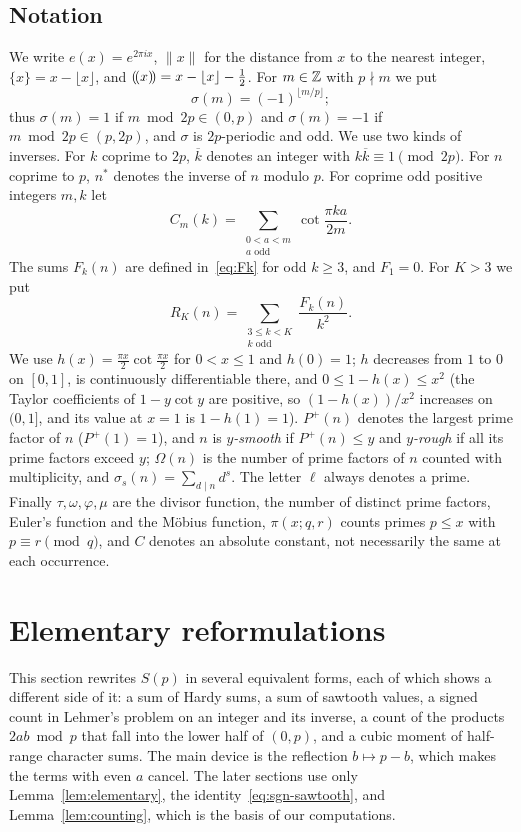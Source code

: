 \subsection{Notation}\label{subsec:notation}
We write $e(x)=e^{2\pi ix}$, $\|x\|$ for the distance from $x$ to the nearest integer, $\{x\}=x-\lfloor x\rfloor$, and $(\!(x)\!)=x-\lfloor x\rfloor-\frac12$. For $m\in\mathbb{Z}$ with $p\nmid m$ we put
\[
\sigma(m)=(-1)^{\lfloor m/p\rfloor};
\]
thus $\sigma(m)=1$ if $m\bmod2p\in(0,p)$ and $\sigma(m)=-1$ if $m\bmod2p\in(p,2p)$, and $\sigma$ is $2p$-periodic and odd. We use two kinds of inverses. For $k$ coprime to $2p$, $\overline k$ denotes an integer with $k\overline k\equiv1\pmod{2p}$. For $n$ coprime to $p$, $n^*$ denotes the inverse of $n$ modulo $p$. For coprime odd positive integers $m,k$ let
\[
C_m(k)=\sum_{\substack{0<a<m\\ a\text{ odd}}}\cot\frac{\pi ka}{2m}.
\]
The sums $F_k(n)$ are defined in~\eqref{eq:Fk} for odd $k\ge3$, and $F_1=0$. For $K>3$ we put
\[
R_K(n)=\sum_{\substack{3\le k<K\\ k\text{ odd}}}\frac{F_k(n)}{k^2}.
\]
We use $h(x)=\frac{\pi x}2\cot\frac{\pi x}2$ for $0<x\le1$ and $h(0)=1$; $h$ decreases from $1$ to $0$ on $[0,1]$, is continuously differentiable there, and $0\le1-h(x)\le x^2$ (the Taylor coefficients of $1-y\cot y$ are positive, so $(1-h(x))/x^2$ increases on $(0,1]$, and its value at $x=1$ is $1-h(1)=1$). $P^+(n)$ denotes the largest prime factor of $n$ ($P^+(1)=1$), and $n$ is \emph{$y$-smooth} if $P^+(n)\le y$ and \emph{$y$-rough} if all its prime factors exceed $y$; $\Omega(n)$ is the number of prime factors of $n$ counted with multiplicity, and $\sigma_s(n)=\sum_{d\mid n}d^s$. The letter $\ell$ always denotes a prime. Finally $\tau,\omega,\varphi,\mu$ are the divisor function, the number of distinct prime factors, Euler's function and the M\"obius function, $\pi(x;q,r)$ counts primes $p\le x$ with $p\equiv r\pmod q$, and $C$ denotes an absolute constant, not necessarily the same at each occurrence.

\section{Elementary reformulations}\label{sec:elementary}

This section rewrites $S(p)$ in several equivalent forms, each of which shows a different side of it: a sum of Hardy sums, a sum of sawtooth values, a signed count in Lehmer's problem on an integer and its inverse, a count of the products $2ab\bmod p$ that fall into the lower half of $(0,p)$, and a cubic moment of half-range character sums. The main device is the reflection $b\mapsto p-b$, which makes the terms with even $a$ cancel. The later sections use only Lemma~\ref{lem:elementary}, the identity~\eqref{eq:sgn-sawtooth}, and Lemma~\ref{lem:counting}, which is the basis of our computations.

